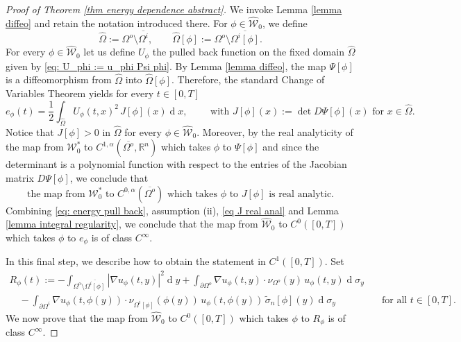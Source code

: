 \documentclass[11pt,reqno,a4paper]{amsart}
\theoremstyle{plain}
\theoremstyle{definition}
\newcommand{\R}{\mathbb{R}}
\renewcommand{\d}[1]{\ensuremath{\operatorname{d}\!{#1}}}
\begin{document}
\begin{proof}[Proof of Theorem \ref{thm energy dependence abstract}]
    We invoke Lemma \ref{lemma diffeo} and retain the notation introduced there. For $\phi \in \widehat{\mathcal{W}}_0$, we define
    \[
    \widehat\Omega:=\Omega^o\setminus\overline{\Omega^i},
    \qquad
    \widehat\Omega[\phi]:=\Omega^o\setminus\overline{\Omega^i[\phi]}.
    \]
    For every $\phi\in \widehat{\mathcal{W}}_0$ let us define $U_\phi$ the pulled back function on the fixed domain $\widehat\Omega$  given by \eqref{eq: U_phi := u_phi Psi phi}. By Lemma \ref{lemma diffeo}, the map $\Psi[\phi]$ is a diffeomorphism from $\widehat\Omega$ into $\widehat\Omega[\phi]$. Therefore, the standard Change of Variables Theorem yields for every $t \in [0,T]$
    \begin{equation}\label{eq: energy pull back}
        e_\phi(t)= \frac{1}{2} \int_{\widehat\Omega} U_\phi(t,x)^2\,J[\phi](x) \d x,
     \qquad
     \text{ with } J[\phi](x):=\det D\Psi[\phi](x) \text{ for } x \in \widehat\Omega.
    \end{equation}
    Notice that $J[\phi]>0$ in $\widehat\Omega$ for every $\phi \in \widehat{\mathcal{W}}_0$. Moreover, by the real analyticity of the map from $\mathcal{W}^*_0$ to $C^{1,\alpha}(\overline{\Omega^o},\R^n)$ which takes $\phi$ to $\Psi[\phi]$ and since the determinant is a polynomial function with respect to the entries of the Jacobian matrix $D \Psi[\phi]$, we conclude that
    \begin{equation}\label{eq J real anal}
            \text{the map from $\mathcal{W}^*_0$ to $C^{0,\alpha}(\overline{\Omega^o})$ which takes $\phi$ to $J[\phi]$ is real analytic.}
    \end{equation}
    Combining \eqref{eq: energy pull back}, assumption (ii), \eqref{eq J real anal} and Lemma \ref{lemma integral regularity}, we conclude that the map from $\widehat{\mathcal{W}}_0$ to $C^0([0,T])$ which takes $\phi$ to $e_\phi$ is of class $C^\infty$.

    In this final step, we describe how to obtain the statement in $C^1([0,T])$. Set
    \begin{equation*}
    \begin{split}
        R_\phi(t)
        :=
        - \int_{\Omega^o \setminus \overline{\Omega^i[\phi]}} |\nabla u_\phi(t,y)|^2 \d y 
        + \int_{\partial\Omega^o} \nabla u_\phi(t,y)\cdot \nu_{\Omega^o}(y) \, u_{\phi}(t,y) \d \sigma_y &
        \\
         \quad
        - \int_{\partial\Omega^i} \nabla u_\phi(t,\phi(y))\cdot \nu_{\Omega^i[\phi]}(\phi(y)) \, u_\phi(t,\phi(y)) \, \tilde\sigma_n[\phi](y) \d\sigma_y & \quad \text{for all } t\in [0,T].
    \end{split}        
    \end{equation*}
    We now prove that the map from $\widehat{\mathcal W}_0$ to $C^0([0,T])$ which takes $\phi$ to $R_\phi$ is of class $C^\infty$. 


\end{proof}
\end{document}
